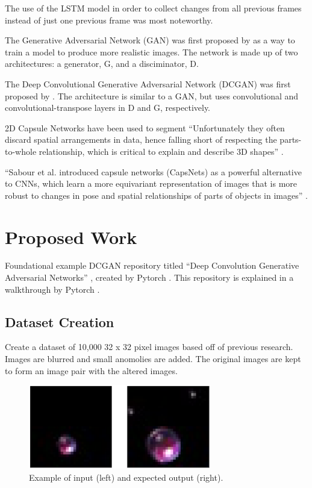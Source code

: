 \documentclass[letterpaper]{article} %
\begin{document}
The use of the LSTM model in order to
collect changes from all previous frames instead of just one previous frame
was most noteworthy.

The Generative Adversarial Network (GAN) was first proposed by
\cite{generative_adversarial_networks}
as a way to
train a model to produce more realistic images. The network is made up of two architectures:
a generator, G, and a disciminator, D.

The Deep Convolutional Generative Adversarial Network (DCGAN) was first proposed by
\cite{unsupervised_learning}. The architecture is similar to a GAN,
but uses convolutional and convolutional-transpose layers in D and G, respectively.

2D Capsule Networks have been used to segment ``Unfortunately they often discard
spatial arrangements in data, hence falling short of respecting
the parts-to-whole relationship, which is critical to explain
and describe 3D shapes'' \cite{point_capsule}.

``Sabour et al. \cite{dynamic_routing_capsules} introduced capsule networks (CapsNets) as a powerful
alternative to CNNs, which learn a more
equivariant
representation of images
that is more robust to changes in pose and spatial relationships of parts of objects
in images'' \cite{transforming_auto-encoders}.


\section{Proposed Work}
\label{sec:proposed_work}
Foundational example DCGAN repository titled ``Deep Convolution Generative Adversarial Networks''
, created by Pytorch \cite{dcgan_git}. This repository is explained in a walkthrough
by Pytorch \cite{dcgan_example}.

\subsection{Dataset Creation}
\label{subsec:data}
Create a dataset of 10,000 32 x 32 pixel images based off of previous research.
Images are blurred and small anomolies are added.
The original images are kept to form an image pair with the altered images.

\begin{figure}[htbp]
\centerline{\includegraphics[width=8cm]{training_pair.png}}
\caption{Example of input (left) and expected output (right).}
\label{fig:training_pair}
\end{figure}
\end{document}
